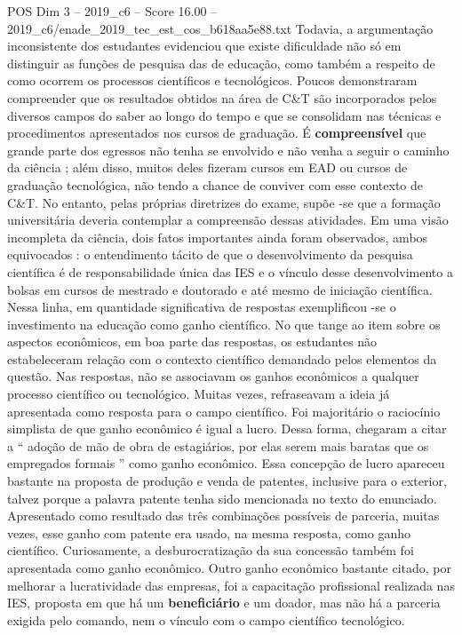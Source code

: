 \begin{textsample}{POS Dim 3 – 2019\_c6 – Score 16.00 – 2019\_c6/enade\_2019\_tec\_est\_cos\_b618aa5e88.txt}
Todavia, a argumentação inconsistente dos estudantes evidenciou que existe dificuldade não só em distinguir as funções de pesquisa das de educação, como também a respeito de como ocorrem os processos científicos e tecnológicos.
Poucos demonstraram compreender que os resultados obtidos na área de C\&T são incorporados pelos diversos campos do saber ao longo do tempo e que se consolidam nas técnicas e procedimentos apresentados nos cursos de graduação.
É \textbf{compreensível} que grande parte dos egressos não tenha se envolvido e não venha a seguir o caminho da ciência ; além disso, muitos deles fizeram cursos em EAD ou cursos de graduação tecnológica, não tendo a chance de conviver com esse contexto de C\&T.
No entanto, pelas próprias diretrizes do exame, supõe -se que a formação universitária deveria contemplar a compreensão dessas atividades.
Em uma visão incompleta da ciência, dois fatos importantes ainda foram observados, ambos equivocados : o entendimento tácito de que o desenvolvimento da pesquisa científica é de responsabilidade única das IES e o vínculo desse desenvolvimento a bolsas em cursos de mestrado e doutorado e até mesmo de iniciação científica.
Nessa linha, em quantidade significativa de respostas exemplificou -se o investimento na educação como ganho científico.
No que tange ao item sobre os aspectos econômicos, em boa parte das respostas, os estudantes não estabeleceram relação com o contexto científico demandado pelos elementos da questão.
Nas respostas, não se associavam os ganhos econômicos a qualquer processo científico ou tecnológico.
Muitas vezes, refraseavam a ideia já apresentada como resposta para o campo científico.
Foi majoritário o raciocínio simplista de que ganho econômico é igual a lucro.
Dessa forma, chegaram a citar a “ adoção de mão de obra de estagiários, por elas serem mais baratas que os empregados formais ” como ganho econômico.
Essa concepção de lucro apareceu bastante na proposta de produção e venda de patentes, inclusive para o exterior, talvez porque a palavra patente tenha sido mencionada no texto do enunciado.
Apresentado como resultado das três combinações possíveis de parceria, muitas vezes, esse ganho com patente era usado, na mesma resposta, como ganho científico.
Curiosamente, a desburocratização da sua concessão também foi apresentada como ganho econômico.
Outro ganho econômico bastante citado, por melhorar a lucratividade das empresas, foi a capacitação profissional realizada nas IES, proposta em que há um \textbf{beneficiário} e um doador, mas não há a parceria exigida pelo comando, nem o vínculo com o campo científico tecnológico.

\end{textsample}
